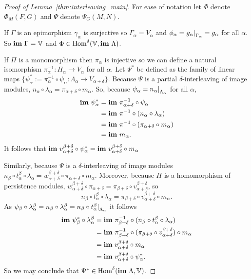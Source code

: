 \begin{proof}[Proof of Lemma~\ref{thm:interleaving_main}]
  For ease of notation let $\Phi$ denote $\Phi_M(F, G)$ and $\Psi$ denote $\Psi_G(M, N)$.

  If $\Gamma$ is an epimorphism $\gamma_\alpha$ is surjective so $\Gamma_\alpha = V_\alpha$ and $\phi_{\alpha} = g_{\alpha}\mathord{\mid}_{\Gamma_\alpha} = g_\alpha$ for all $\alpha$.
  So $\mathbf{im}~\Gamma = \mathbb{V}$ and $\Phi\in\mathrm{Hom}^\delta(\mathbb{V},\mathbf{im}~\Lambda)$.

  If $\Pi$ is a monomorphism then $\pi_\alpha$ is injective so we can define a natural isomorphism $\pi_\alpha^{-1} : \Pi_\alpha\to V_\alpha$ for all $\alpha$.
  Let $\Psi^*$ be defined as the family of linear maps $\{\psi_\alpha^* := \pi^{-1}_\alpha \circ \psi_\alpha : \Lambda_\alpha\to V_{\alpha+\delta}\}$.
  Because $\Psi$ is a partial $\delta$-interleaving of image modules, $n_\alpha\circ\lambda_\alpha = \pi_{\alpha+\delta}\circ m_\alpha$.
  So, because $\psi_\alpha = n_\alpha\mathord{\mid}_{\Lambda_\alpha}$ for all $\alpha$,
  \begin{align*}
    \mathbf{im}~\psi_\alpha^* &= \mathbf{im}~\pi^{-1}_{\alpha+\delta}\circ\psi_\alpha\\
                      &= \mathbf{im}~\pi^{-1}\circ (n_\alpha\circ\lambda_\alpha)\\
                      &= \mathbf{im}~\pi^{-1}\circ (\pi_{\alpha+\delta}\circ m_\alpha)\\
                      &= \mathbf{im}~ m_\alpha.
  \end{align*}
  It follows that $\mathbf{im}~v_{\alpha+\delta}^{\beta+\delta}\circ\psi_\alpha^* = \mathbf{im}~v_{\alpha+\delta}^{\beta+\delta}\circ m_\alpha$

  Similarly, because $\Psi$ is a $\delta$-interleaving of image modules $n_\beta\circ t_\alpha^\beta\circ \lambda_\alpha = w_{\alpha+\delta}^{\beta+\delta}\circ\pi_{\alpha+\delta}\circ m_\alpha$.
  Moreover, because $\Pi$ is a homomorphism of persistence modules, $w_{\alpha+\delta}^{\beta+\delta}\circ\pi_{\alpha+\delta} = \pi_{\beta+\delta}\circ v_{\alpha+\delta}^{\beta+\delta}$, so
  \[ n_\beta\circ t_\alpha^\beta\circ \lambda_\alpha = \pi_{\beta+\delta}\circ v_{\alpha+\delta}^{\beta+\delta}\circ m_\alpha.\]
  As $\psi_\beta\circ\lambda_\alpha^\beta = n_\beta\circ\lambda_\alpha^\beta = n_\beta\circ t_\alpha^\beta\mathord{\mid}_{\Lambda_\alpha}$ it follows
  \begin{align*}
    \mathbf{im}~\psi_\beta^*\circ\lambda_\alpha^\beta &= \mathbf{im}~\pi^{-1}_{\beta+\delta}\circ (n_\beta\circ t_\alpha^\beta\circ\lambda_\alpha)\\
      &= \mathbf{im}~\pi^{-1}_{\beta+\delta}\circ (\pi_{\beta+\delta}\circ v_{\alpha+\delta}^{\beta+\delta})\circ m_\alpha\\
      &= \mathbf{im}~v_{\alpha+\delta}^{\beta+\delta}\circ m_\alpha\\
      &= \mathbf{im}~v_{\alpha+\delta}^{\beta+\delta}\circ\psi_\alpha^*.
  \end{align*}
  So we may conclude that $\Psi^*\in\mathrm{Hom}^\delta(\mathbf{im}~\Lambda,\mathbb{V})$.


\end{proof}
